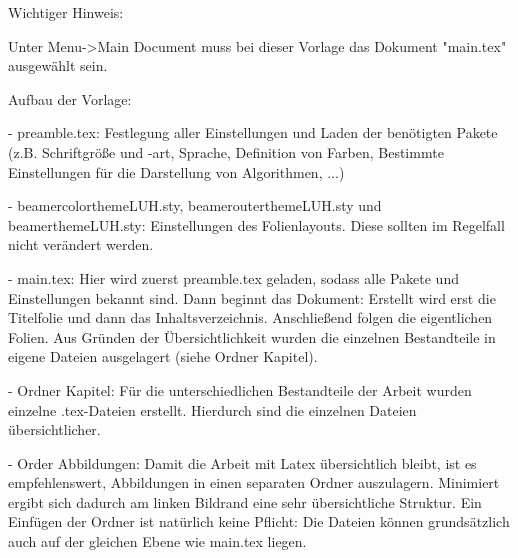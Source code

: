 Wichtiger Hinweis:

Unter Menu->Main Document muss bei dieser Vorlage das Dokument "main.tex" ausgewählt sein.

Aufbau der Vorlage:

- preamble.tex: Festlegung aller Einstellungen und Laden der benötigten Pakete (z.B. Schriftgröße und -art, Sprache, Definition von Farben, Bestimmte Einstellungen für die Darstellung von Algorithmen, ...)

- beamercolorthemeLUH.sty, beamerouterthemeLUH.sty und beamerthemeLUH.sty: Einstellungen des Folienlayouts. Diese sollten im Regelfall nicht verändert werden.

- main.tex: Hier wird zuerst preamble.tex geladen, sodass alle Pakete und Einstellungen bekannt sind. Dann beginnt das Dokument: Erstellt wird erst die Titelfolie und dann das Inhaltsverzeichnis. Anschließend folgen die eigentlichen Folien. Aus Gründen der Übersichtlichkeit wurden die einzelnen Bestandteile in eigene Dateien ausgelagert (siehe Ordner Kapitel).

- Ordner Kapitel: Für die unterschiedlichen Bestandteile der Arbeit wurden einzelne .tex-Dateien erstellt. Hierdurch sind die einzelnen Dateien übersichtlicher.

- Order Abbildungen: Damit die Arbeit mit Latex übersichtlich bleibt, ist es empfehlenswert, Abbildungen in einen separaten Ordner auszulagern. Minimiert ergibt sich dadurch am linken Bildrand eine sehr übersichtliche Struktur. Ein Einfügen der Ordner ist natürlich keine Pflicht: Die Dateien können grundsätzlich auch auf der gleichen Ebene wie main.tex liegen.
